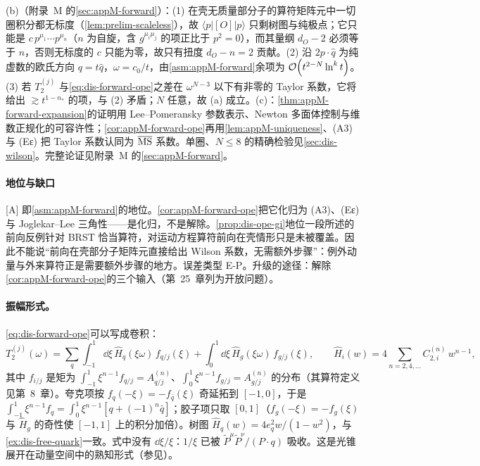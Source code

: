 \begin{proofsketch}
(b)（附录~M 的\cref{sec:appM-forward}）：(1) 在壳无质量部分子的算符矩阵元中一切圈积分都无标度（\cref{lem:prelim-scaleless}），故 $\langle p|[O]|p\rangle$ 只剩树图与纯极点；它只能是 $c\,p^{\mu_1}\cdots p^{\mu_n}$（$n$ 为自旋，含 $g^{\mu_i\mu_j}$ 的项正比于 $p^2=0$），而其量纲 $d_O-2$ 必须等于 $n$，否则无标度的 $c$ 只能为零，故只有扭度 $d_O-n=2$ 贡献。(2) 沿 $2p\cdot\hat q$ 为纯虚数的欧氏方向 $q=t\hat q$，$\omega=c_0/t$，由\cref{asm:appM-forward}余项为 $\mathcal{O}\!\left(t^{2-N}\ln^kt\right)$。(3) 若 $T_2^{(j)}$ 与\cref{eq:dis-forward-ope}之差在 $\omega^{N-3}$ 以下有非零的 Taylor 系数，它将给出 $\gtrsim t^{1-n_*}$ 的项，与 (2) 矛盾；$N$ 任意，故 (a) 成立。(c)：\cref{thm:appM-forward-expansion}的证明用 Lee--Pomeransky 参数表示、Newton 多面体控制与维数正规化的可容许性；\cref{cor:appM-forward-ope}再用\cref{lem:appM-uniqueness}、(A3) 与 (Eε) 把 Taylor 系数认同为 $\overline{\rm MS}$ 系数。单圈、$N\le8$ 的精确检验见\cref{sec:dis-wilson}。完整论证见附录~M 的\cref{sec:appM-forward}。
\end{proofsketch}

\paragraph{地位与缺口}
[A] 即\cref{asm:appM-forward}的地位。\cref{cor:appM-forward-ope}把它化归为 (A3)、(Eε) 与 Joglekar--Lee 三角性——是化归，不是解除。\cref{prop:dis-ope-gi}地位一段所述的前向反例针对 BRST 恰当算符，对运动方程算符前向在壳情形只是未被覆盖。因此不能说“前向在壳部分子矩阵元直接给出 Wilson 系数，无需额外步骤”：例外动量与外来算符正是需要额外步骤的地方。误差类型 E-P。升级的途径：解除\cref{cor:appM-forward-ope}的三个输入（第~25~章列为开放问题）。

\paragraph{振幅形式。}\cref{eq:dis-forward-ope}可以写成卷积：
\begin{equation}\label{eq:dis-amplitude-form}
T_2^{(j)}(\omega)=\sum_q\int_{-1}^1\dd\xi\,\hat H_q(\xi\omega)\,f_{q/j}(\xi)+\int_0^1\dd\xi\,\hat H_g(\xi\omega)\,f_{g/j}(\xi),\qquad \hat H_i(w)=4\sum_{n=2,4,\dots}C^{(n)}_{2,i}\,w^{n-1},
\end{equation}
其中 $f_{i/j}$ 是矩为 $\int_{-1}^1\xi^{n-1}f_{q/j}=A^{(n)}_{q/j}$、$\int_0^1\xi^{n-1}f_{g/j}=A^{(n)}_{g/j}$ 的分布（其算符定义见第~8~章）。夸克项按 $f_q(-\xi)=-f_{\bar q}(\xi)$ 奇延拓到 $[-1,0]$，于是 $\int_{-1}^1\xi^{n-1}f_q=\int_0^1\xi^{n-1}[q+(-1)^n\bar q]$；胶子项只取 $[0,1]$（$f_g(-\xi)=-f_g(\xi)$ 与 $\hat H_g$ 的奇性使 $[-1,1]$ 上的积分加倍）。树图 $\hat H_q(w)=4e_q^2w/(1-w^2)$，与\cref{ex:dis-free-quark}一致。式中没有 $\dd\xi/\xi$：$1/\xi$ 已被 $\tilde P^\mu\tilde P^\nu/(P\cdot q)$ 吸收。这是光锥展开在动量空间中的熟知形式（参见\cite{ChristHasslacherMueller1972,BrandtPreparata1971}）。

